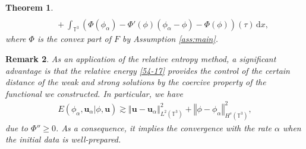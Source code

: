 \documentclass[reqno,a4paper,11pt]{amsart}
\theoremstyle{plain}
\newtheorem{theorem}{Theorem}[section]
\newtheorem{remark}[theorem]{Remark}
\numberwithin{equation}{section}
\newcommand{\bb}[1]{\mathbb{#1}}
\newcommand{\bbt}{\bb{T}}
\newcommand{\bu}{\mathbf{u}}
\renewcommand{\d}{\mathrm{d}}
\newcommand{\dx}{\d x}
\newcommand{\norm}[1]{\left\Vert #1 \right \Vert}
\begin{document}
\begin{theorem}
\begin{align}
									\\&\label{54-17}
									\quad +\int_{\mathbb{T}^{3}}(\Phi(\phi_{\alpha})-\Phi'(\phi)(\phi_{\alpha}-\phi)-\Phi(\phi))(\tau)\,\dx,
								\end{align}
								where $\Phi$ is the convex part of $F$ by Assumption \ref{ass:main}.
							\end{theorem}
							\begin{remark}
								As an application of the relative entropy method, a significant advantage is that the relative energy \eqref{54-17} provides the control of the certain distance of the weak and strong solutions by the coercive property of the functional we constructed. In particular, we have
								\begin{align*}
									E(\phi_{\alpha},\mathbf{u}_{\alpha}|\phi,\mathbf{u}) \gtrsim \norm{\bu-\bu_\alpha}_{L^2(\bbt^3)}^2
									+ \norm{\phi-\phi_\alpha}_{H^s(\bbt^3)}^2,
								\end{align*}
								due to $\Phi'' \geq 0$.
								As a consequence, it implies the convergence with the rate $\alpha$  when the initial data is well-prepared.
							\end{remark}
							
							
							
							
\end{document}
